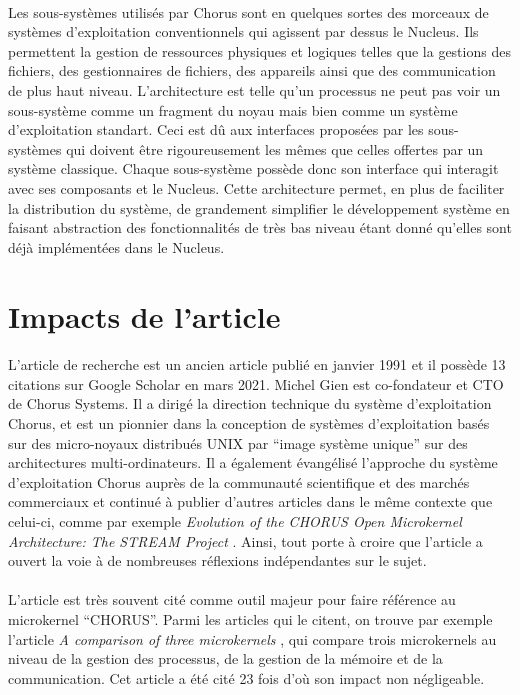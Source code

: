 \documentclass[a4paper, 12pt]{article}
\begin{document}
\paragraph{}
Les sous-systèmes utilisés par Chorus sont en quelques sortes des morceaux de systèmes d'exploitation conventionnels qui agissent par dessus le Nucleus. Ils permettent la gestion de ressources physiques et logiques telles que la gestions des fichiers, des gestionnaires de fichiers, des appareils ainsi que des communication de plus haut niveau. L'architecture est telle qu'un processus ne peut pas voir un sous-système comme un fragment du noyau mais bien comme un système d'exploitation standart. Ceci est dû aux interfaces proposées par les sous-systèmes qui doivent être rigoureusement les mêmes que celles offertes par un système classique. Chaque sous-système possède donc son interface qui interagit avec ses composants et le Nucleus. Cette architecture permet, en plus de faciliter la distribution du système, de grandement simplifier le développement système en faisant abstraction des fonctionnalités de très bas niveau étant donné qu'elles sont déjà implémentées dans le Nucleus.

\clearpage 
\section{Impacts de l'article}
\paragraph{}
L’article de recherche est un ancien article publié en janvier 1991 et il possède 13 citations sur Google Scholar en mars 2021.
\newline 
Michel Gien est co-fondateur et CTO de Chorus Systems. Il a dirigé la direction technique du système d'exploitation Chorus, et est un pionnier dans la conception de systèmes d'exploitation basés sur des micro-noyaux distribués UNIX par ``image système unique'' sur des architectures multi-ordinateurs. Il a  également évangélisé l'approche du système d'exploitation Chorus auprès de la communauté scientifique et des marchés commerciaux et continué à publier d'autres articles dans le même contexte que celui-ci, comme par exemple \emph{Evolution of the CHORUS Open Microkernel Architecture: The STREAM Project} \cite{n1}. Ainsi, tout porte à croire que l'article a ouvert la voie à de nombreuses réflexions indépendantes sur le sujet.
\paragraph{}
L'article est très souvent cité comme outil majeur pour faire référence au microkernel ``CHORUS''. Parmi les articles qui le citent, on trouve par exemple l'article \emph{A comparison of three microkernels} \cite{n2}, qui compare trois microkernels au niveau de la gestion des processus, de la gestion de la mémoire et de la communication. Cet article a été cité 23 fois d'où son impact non négligeable.
\end{document}

